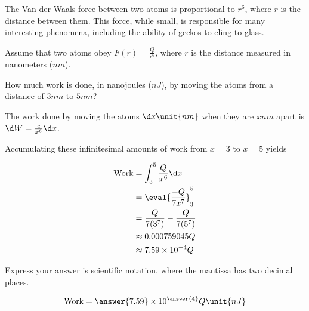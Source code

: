 \documentclass{ximera}
\author{Steven Gubkin}
\begin{document}
\begin{exercise}


The Van der Waals force between two atoms is proportional to $r^6$, where $r$ is the distance between them.  This force, while small, is responsible for many interesting phenomena, including the ability of geckos to cling to glass.

Assume that two atoms obey $F(r) = \frac{Q}{r^6}$, where $r$ is the distance measured in nanometers ($\unit{nm}$).

How much work is done, in nanojoules ($\unit{nJ}$), by moving the atoms from a distance of  $3 \unit{nm}$ to $5 \unit{nm}$?

\begin{hint}
The work done by moving the atoms $\d x \unit{nm}$ when they are $x \unit{nm}$ apart is $\d W = \frac{c}{x^6} \d x$.
\end{hint}

\begin{hint}
Accumulating these infinitesimal amounts of work from $x = 3$ to $x = 5$ yields

\begin{align*}
\textrm{Work} &=  \int_3^5 \frac{Q}{x^6} \d x\\
	&= \eval{\frac{-Q}{7x^7}}_3^5\\
	&=\frac{Q}{7(3^7)} - \frac{Q}{7(5^7)}\\
	&\approx 0.000759045 Q\\
	&\approx 7.59 \times 10^{-4} Q
\end{align*}
\end{hint}

\begin{prompt}
	Express your answer is scientific notation, where the mantissa has two decimal places.
	
	\[
	\textrm{Work} = \answer{7.59} \times 10^{\answer{4}} Q \unit{nJ}
	\]
\end{prompt}

\end{exercise}
\end{document}
